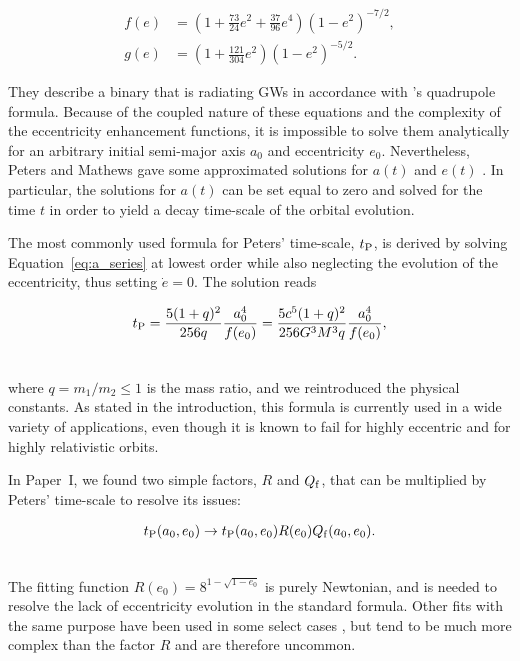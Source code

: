 \documentclass[usenatbib]{mnras}
\begin{document}
\begin{align}
    f(e)&=\left(1 + \frac{73}{24}e^2 +\frac{37}{96}e^4\right)(1-e^2)^{-7/2}, \\
    g(e)&=\left(1 + \frac{121}{304}e^2 \right)(1-e^2)^{-5/2}.
\end{align}

They describe a binary that is radiating GWs in accordance with \citet{GR}'s quadrupole formula. Because of the coupled nature of these equations and the complexity of the eccentricity enhancement functions, it is impossible to solve them analytically for an arbitrary initial semi-major axis $a_0$ and eccentricity $e_0$. Nevertheless, Peters and Mathews gave some approximated solutions for $a(t)$ and $e(t)$ \citep[see][]{Peters_Mathews_1963,Peters_1964}. In particular, the solutions for $a(t)$ can be set equal to zero and solved for the time $t$ in order to yield a decay time-scale of the orbital evolution.

The most commonly used formula for Peters' time-scale, $t_{\rm P}$, is derived by solving Equation~\eqref{eq:a_series} at lowest order while also neglecting the evolution of the eccentricity, thus setting $\dot{e}= 0$. The solution reads

\begin{align}
    t_{\rm P} = \frac{5(1 + q)^2}{256q} \frac{a_0^4}{f(e_0)}= \frac{5c^5(1 + q)^2}{256 G^3 M^3q} \frac{a_0^4}{f(e_0)}, \label{eq:pet}\\ \nonumber
\end{align}

\noindent where $q = m_1/m_2 \leq 1$ is the mass ratio, and we reintroduced the physical constants. As stated in the introduction, this formula is currently used in a wide variety of applications, even though it is known to fail for highly eccentric and for highly relativistic orbits.

In Paper~I, we found two simple factors, $R$ and $Q_{\rm f}$, that can be multiplied by Peters' time-scale to resolve its issues:

\begin{align}
t_{\rm P}(a_0,e_0) \to t_{\rm P}(a_0,e_0)R(e_0)Q_{\rm f}(a_0,e_0). \\ \nonumber
\end{align}

The fitting function $R(e_0) = 8^{ 1- \sqrt{1-e_0}}$ is purely Newtonian, and is needed to resolve the lack of eccentricity evolution in the standard formula. Other fits with the same purpose have been used in some select cases \citep[see, e.g.][]{Bonetti_et_al_2018}, but tend to be much more complex than the factor $R$ and are therefore uncommon.
\end{document}
